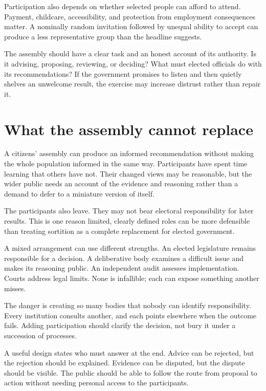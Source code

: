 \documentclass[12pt,a4paper]{book}
\begin{document}
Participation also depends on whether selected people can afford to attend. Payment, childcare, accessibility, and protection from employment consequences matter. A nominally random invitation followed by unequal ability to accept can produce a less representative group than the headline suggests.

The assembly should have a clear task and an honest account of its authority. Is it advising, proposing, reviewing, or deciding? What must elected officials do with its recommendations? If the government promises to listen and then quietly shelves an unwelcome result, the exercise may increase distrust rather than repair it.

\section*{What the assembly cannot replace}

A citizens' assembly can produce an informed recommendation without making the whole population informed in the same way. Participants have spent time learning that others have not. Their changed views may be reasonable, but the wider public needs an account of the evidence and reasoning rather than a demand to defer to a miniature version of itself.

The participants also leave. They may not bear electoral responsibility for later results. This is one reason limited, clearly defined roles can be more defensible than treating sortition as a complete replacement for elected government.

A mixed arrangement can use different strengths. An elected legislature remains responsible for a decision. A deliberative body examines a difficult issue and makes its reasoning public. An independent audit assesses implementation. Courts address legal limits. None is infallible; each can expose something another misses.

The danger is creating so many bodies that nobody can identify responsibility. Every institution consults another, and each points elsewhere when the outcome fails. Adding participation should clarify the decision, not bury it under a succession of processes.

A useful design states who must answer at the end. Advice can be rejected, but the rejection should be explained. Evidence can be disputed, but the dispute should be visible. The public should be able to follow the route from proposal to action without needing personal access to the participants.
\end{document}
